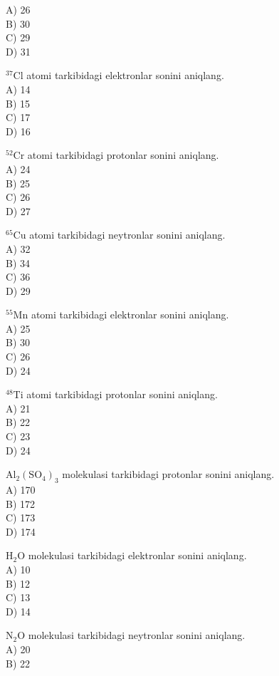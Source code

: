 A) 26\\
B) 30\\
C) 29\\
D) 31
  \item ${ }^{37} \mathrm{Cl}$ atomi tarkibidagi elektronlar sonini aniqlang.\\
A) 14\\
B) 15\\
C) 17\\
D) 16
  \item ${ }^{52} \mathrm{Cr}$ atomi tarkibidagi protonlar sonini aniqlang.\\
A) 24\\
B) 25\\
C) 26\\
D) 27
  \item ${ }^{65} \mathrm{Cu}$ atomi tarkibidagi neytronlar sonini aniqlang.\\
A) 32\\
B) 34\\
C) 36\\
D) 29
  \item ${ }^{55} \mathrm{Mn}$ atomi tarkibidagi elektronlar sonini aniqlang.\\
A) 25\\
B) 30\\
C) 26\\
D) 24
  \item ${ }^{48} \mathrm{Ti}$ atomi tarkibidagi protonlar sonini aniqlang.\\
A) 21\\
B) 22\\
C) 23\\
D) 24
  \item $\mathrm{Al}_{2}\left(\mathrm{SO}_{4}\right)_{3}$ molekulasi tarkibidagi protonlar sonini aniqlang.\\
A) 170\\
B) 172\\
C) 173\\
D) 174
  \item $\mathrm{H}_{2} \mathrm{O}$ molekulasi tarkibidagi elektronlar sonini aniqlang.\\
A) 10\\
B) 12\\
C) 13\\
D) 14
  \item $\mathrm{N}_{2} \mathrm{O}$ molekulasi tarkibidagi neytronlar sonini aniqlang.\\
A) 20\\
B) 22\\
